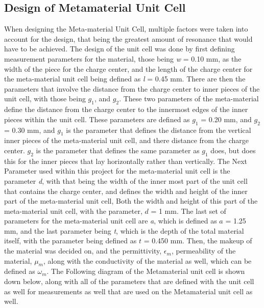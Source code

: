 \documentclass[]{article}
\begin{document}
\subsection*{Design of Metamaterial Unit Cell}
When designing the Meta-material Unit Cell, multiple factors were taken into account for the design, that being the greatest amount of resonance that would have to be achieved. The design of the unit cell was done by first defining measurement parameters for the material, those being \textit{w} = 0.10 mm, as the width of the piece for the charge center, and the length of the charge center for the meta-material unit cell being defined as \textit{l} = 0.45 mm. There are then the parameters that involve the distance from the charge center to inner pieces of the unit cell, with those being $g_{1}$, and $g_{2}$. These two parameters of the meta-material define the distance from the charge center to the innermost edges of the inner pieces within the unit cell. These parameters are defined as $g_{1}$ = 0.20 mm, and $g_{2}$ = 0.30 mm, and $g_{1}$ is the parameter that defines the distance from the vertical inner pieces of the meta-material unit cell, and there distance from the charge center. $g_{2}$ is the parameter that defines the same parameter as $g_{1}$ does, but does this for the inner pieces that lay horizontally rather than vertically. The Next Parameter used within this project for the meta-material unit cell is the parameter \textit{d}, with that being the width of the inner most part of the unit cell that contains the charge center, and defines the width and height of the inner part of the meta-material unit cell, Both the width and height of this part of the meta-material unit cell, with the parameter, $d$ = 1 mm. The last set of parameters for the meta-material unit cell are \textit{a}, which is defined as $a$ = 1.25 mm, and the last parameter being \textit{t}, which is the depth of the total material itself, with the parameter being defined as $t$ = 0.450 mm. Then, the makeup of the material was decided on, and the permittivity, $\epsilon_m$, permeability of the material, $\mu_m$, along with the conductivity of the material as well,  which can be defined as $\omega_m$. The Following diagram of the Metamaterial unit cell is shown down below, along with all of the parameters that are defined with the unit cell as well for measurements as well that are used on the Metamaterial unit cell as well.
\end{document}
